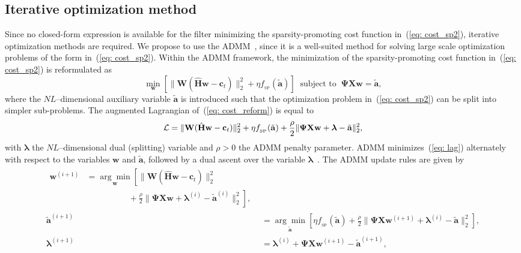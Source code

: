 \documentclass[10pt]{IEEEtran}
\begin{document}
\subsection{Iterative optimization method}
Since no closed-form expression is available for the filter minimizing the sparsity-promoting cost function in~(\ref{eq: cost_sp2}), iterative optimization methods are required.
We propose to use the ADMM~\cite{Boyd_admm_2011}, since it is a well-suited method for solving large scale optimization problems of the form in~(\ref{eq: cost_sp2}).
Within the ADMM framework, the minimization of the sparsity-promoting cost function in~(\ref{eq: cost_sp2}) is reformulated as
\begin{equation}
\label{eq: cost_reform}
\min_{\mathbf{w}} \left[ \|\mathbf{W}(\hat{\mathbf{H}}\mathbf{w}-\mathbf{c}_t) \|_2^2 + \eta f_{_{\text{SP}}}(\tilde{\mathbf{a}}) \right] \; \; {\text{subject to}} \; \; \boldsymbol{\Psi}\mathbf{X}\mathbf{w} = \tilde{\mathbf{a}},
\end{equation}
where the $NL$--dimensional auxiliary variable $\tilde{\mathbf{a}}$ is introduced such that the optimization problem in~(\ref{eq: cost_sp2}) can be split into simpler sub-problems.
The augmented Lagrangian of~(\ref{eq: cost_reform}) is equal to
\begin{equation}
\label{eq: lag}
{\cal{L}} = \|\mathbf{W}(\hat{\mathbf{H}}\mathbf{w}-\mathbf{c}_t) \|_2^2 + \eta f_{_{\text{SP}}}(\tilde{\mathbf{a}}) + \frac{\rho}{2} \|\boldsymbol{\Psi}\mathbf{X}\mathbf{w} +\boldsymbol{\lambda} - \tilde{\mathbf{a}}\|_2^2,
\end{equation}
with $\boldsymbol{\lambda}$ the $NL$--dimensional dual (splitting) variable and $\rho>0$ the ADMM penalty parameter.
ADMM minimizes~(\ref{eq: lag}) alternately with respect to the variables $\mathbf{w}$ and $\tilde{\mathbf{a}}$, followed by a dual ascent over the variable $\boldsymbol{\lambda}$~\cite{Boyd_admm_2011}.
The ADMM update rules are given by
\begin{align}
\label{eq: upw}
\begin{split}
\mathbf{w}^{(i+1)} & = \underset{\mathbf{w}}{\arg\min} \left[ \|\mathbf{W}(\hat{\mathbf{H}}\mathbf{w} - \mathbf{c}_t)\|_2^2  \right. \\
&\quad \quad \quad \quad \quad + \left.\frac{\rho}{2} \|\mathbf{\Psi}\mathbf{X}\mathbf{w} + \boldsymbol{\lambda}^{(i)} - \tilde{\mathbf{a}}^{(i)} \|_2^2 \right],
\end{split} \\
\label{eq: upz}
\tilde{\mathbf{a}}^{(i+1)} & = \underset{\tilde{\mathbf{a}}}{\arg\min} \left[ \eta f_{_{\text{SP}}}(\tilde{\mathbf{a}}) + \frac{\rho}{2} \|\mathbf{\Psi}\mathbf{X}\mathbf{w}^{(i+1)} + \boldsymbol{\lambda}^{(i)} - \tilde{\mathbf{a}} \|_2^2 \right], \\
\label{eq: up_lambda_sls}
\boldsymbol{\lambda}^{(i+1)} & \!=\! \boldsymbol{\lambda}^{(i)} \!+\! \mathbf{\Psi}\mathbf{X}\mathbf{w}^{(i+1)} \!-\! \tilde{\mathbf{a}}^{(i+1)},
\end{align}
\end{document}
